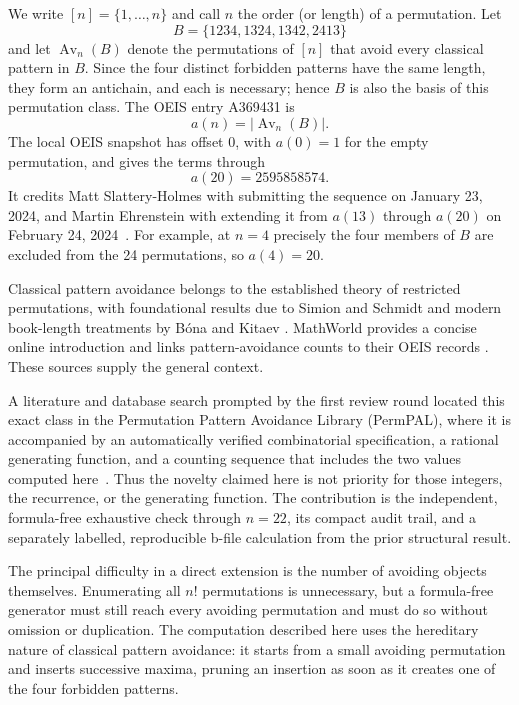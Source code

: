 \documentclass[11pt]{article}
\theoremstyle{definition}
\theoremstyle{remark}
\begin{document}
We write $[n]=\{1,\ldots,n\}$ and call $n$ the order (or length) of a
permutation.  Let
\[
 B=\{1234,1324,1342,2413\}
\]
and let $\operatorname{Av}_n(B)$ denote the permutations of $[n]$ that avoid
every classical pattern in $B$.  Since the four distinct forbidden patterns
have the same length, they form an antichain, and each is necessary; hence
$B$ is also the basis of this permutation class.  The OEIS entry A369431 is
\begin{equation}
 a(n)=\lvert\operatorname{Av}_n(B)\rvert .
 \label{eq:definition}
\end{equation}
The local OEIS snapshot has offset $0$, with $a(0)=1$ for the empty
permutation, and gives the terms through
\[
 a(20)=2595858574.
\]
It credits Matt Slattery-Holmes with submitting the sequence on January 23,
2024, and Martin Ehrenstein with extending it from $a(13)$ through $a(20)$ on
February 24, 2024~\cite{oeisA369431}.  For example, at $n=4$ precisely the four
members of $B$ are excluded from the 24 permutations, so $a(4)=20$.

Classical pattern avoidance belongs to the established theory of restricted
permutations, with foundational results due to Simion and Schmidt and modern
book-length treatments by B\'ona and Kitaev
\cite{simionSchmidt1985,bona2022,kitaev2011}.  MathWorld provides a concise
online introduction and links pattern-avoidance counts to their OEIS records
\cite{weissteinPermutationPattern}.  These sources supply the general context.

A literature and database search prompted by the first review round located
this exact class in the Permutation Pattern Avoidance Library (PermPAL), where
it is accompanied by an automatically verified combinatorial specification,
a rational generating function, and a counting sequence that includes the two
values computed here~\cite{albertEtAl2026,permpalA369431Class}.  Thus the
novelty claimed here is not priority for those integers, the recurrence, or
the generating function.  The contribution is the independent, formula-free
exhaustive check through $n=22$, its compact audit trail, and a separately
labelled, reproducible b-file calculation from the prior structural result.

The principal difficulty in a direct extension is the number of avoiding
objects themselves.  Enumerating all $n!$ permutations is unnecessary, but a
formula-free generator must still reach every avoiding permutation and must
do so without omission or duplication.  The computation described here uses
the hereditary nature of classical pattern avoidance: it starts from a small
avoiding permutation and inserts successive maxima, pruning an insertion as
soon as it creates one of the four forbidden patterns.
\end{document}
